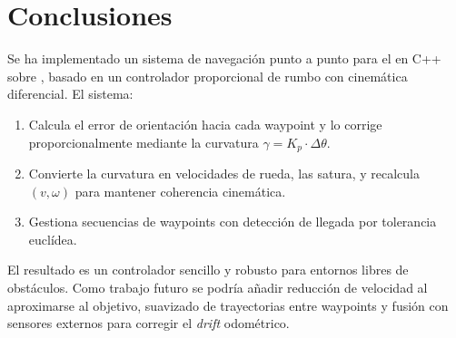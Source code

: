 \documentclass[12pt]{article}
\begin{document}
\section{Conclusiones}
Se ha implementado un sistema de navegaci\'{o}n punto a punto para el \pioneer{} en C++ sobre \ros{}, basado en un controlador proporcional de rumbo con cinem\'{a}tica diferencial. El sistema:

\begin{enumerate}[leftmargin=2em]
  \item Calcula el error de orientaci\'{o}n hacia cada waypoint y lo corrige proporcionalmente mediante la curvatura $\gamma = K_p \cdot \Delta\theta$.
  \item Convierte la curvatura en velocidades de rueda, las satura, y recalcula $(v, \omega)$ para mantener coherencia cinem\'{a}tica.
  \item Gestiona secuencias de waypoints con detecci\'{o}n de llegada por tolerancia eucl\'{i}dea.
\end{enumerate}

El resultado es un controlador sencillo y robusto para entornos libres de obst\'{a}culos. Como trabajo futuro se podr\'{i}a a\~{n}adir reducci\'{o}n de velocidad al aproximarse al objetivo, suavizado de trayectorias entre waypoints y fusi\'{o}n con sensores externos para corregir el \emph{drift} odom\'{e}trico.
\end{document}
